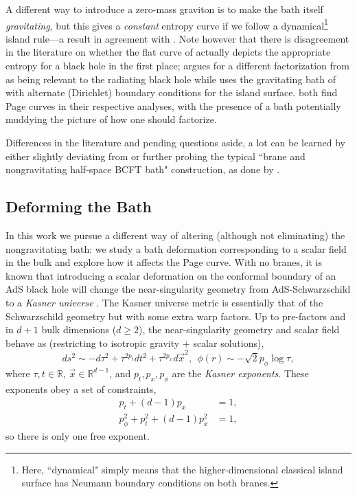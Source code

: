 \documentclass[12pt,a4paper]{article}
\begin{document}
A different way to introduce a zero-mass graviton \cite{Geng:2020fxl} is to make the bath itself \textit{gravitating}, but this gives a \textit{constant} entropy curve if we follow a dynamical\footnote{Here, ``dynamical" simply means that the higher-dimensional classical island surface has Neumann boundary conditions on both branes.} island rule---a result in agreement with \cite{Laddha:2020kvp}. Note however that there is disagreement in the literature on whether the flat curve of \cite{Laddha:2020kvp,Geng:2020fxl} actually depicts the appropriate entropy for a black hole in the first place; \cite{Krishnan:2020oun} argues for a different factorization from \cite{Laddha:2020kvp} as being relevant to the radiating black hole while \cite{Ghosh:2021axl} uses the gravitating bath of \cite{Geng:2020fxl} with alternate (Dirichlet) boundary conditions for the island surface. \cite{Krishnan:2020oun,Ghosh:2021axl} both find Page curves in their respective analyses, with the presence of a bath potentially muddying the picture of how one should factorize.

Differences in the literature and pending questions aside, a lot can be learned by either slightly deviating from or further probing the typical ``brane and nongravitating half-space BCFT bath" construction, as done by \cite{Caceres:2020jcn,Anderson:2021vof,Bhattacharya:2021jrn,Ghosh:2021axl,Geng:2021iyq,Qi:2021sxb,Geng:2021eps}.

\subsection{Deforming the Bath}

In this work we pursue a different way of altering (although not eliminating) the nongravitating bath: we study a bath deformation corresponding to a scalar field in the bulk and explore how it affects the Page curve. With no branes, it is known that introducing a scalar deformation on the conformal boundary of an AdS black hole will change the near-singularity geometry from AdS-Schwarzschild to a \textit{Kasner universe} \cite{Kasner:1921zz,Belinski:1973zz,Das:2006dz,Frenkel:2020ysx}. The Kasner universe metric is essentially that of the Schwarzschild geometry but with some extra warp factors. Up to pre-factors and in $d+1$ bulk dimensions ($d \geq 2$), the near-singularity geometry and scalar field behave as (restricting to isotropic gravity + scalar solutions), 
\begin{equation}
ds^2 \sim -d\tau^2 + \tau^{2p_t}dt^2 + \tau^{2p_x} d\vec{x}^2,\ \ \phi(r) \sim -\sqrt{2} p_\phi \log\tau,\label{kasMet}
\end{equation}
where $\tau,t \in \mathbb{R}$, $\vec{x} \in \mathbb{R}^{d-1}$, and $p_t,p_x,p_\phi$ are the \textit{Kasner exponents}. These exponents obey a set of constraints,
\begin{align}
p_t + (d-1)p_x &= 1,\label{exp1}\\
p_\phi^2 + p_t^2 + (d-1)p_x^2 &= 1,\label{exp2}
\end{align}
so there is only one free exponent.
\end{document}
